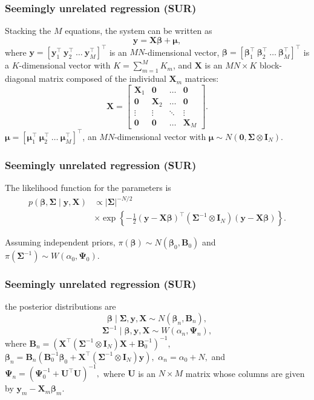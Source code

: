 \documentclass[12pt, compress]{beamer}
\begin{document}
\begin{frame}
	\frametitle{Seemingly unrelated regression (SUR)}
Stacking the $M$ equations, the system can be written as
\[
\bm{y} = \bm{X} \bm{\beta} + \bm{\mu},
\]
where $\bm{y} = \left[\bm{y}_1^{\top} \ \bm{y}_2^{\top} \ \dots \ \bm{y}_M^{\top}\right]^{\top}$ is an $MN$-dimensional vector,
$\bm{\beta} = \left[\bm{\beta}_1^{\top} \ \bm{\beta}_2^{\top} \ \dots \ \bm{\beta}_M^{\top}\right]^{\top}$ is a $K$-dimensional vector with $K = \sum_{m=1}^M K_m$, and $\bm{X}$ is an $MN \times K$ block-diagonal matrix composed of the individual $\bm{X}_m$ matrices:
\[
\bm{X} =
\begin{bmatrix}
	\bm{X}_1 & \bm{0} & \dots & \bm{0} \\
	\bm{0} & \bm{X}_2 & \dots & \bm{0} \\
	\vdots & \vdots & \ddots & \vdots \\
	\bm{0} & \bm{0} & \dots & \bm{X}_M
\end{bmatrix}.
\]
$\bm{\mu} = \left[\bm{\mu}_1^{\top} \ \bm{\mu}_2^{\top} \ \dots \ \bm{\mu}_M^{\top}\right]^{\top}$, an $MN$-dimensional vector with $\bm{\mu} \sim {N}(\bm{0}, \bm{\Sigma} \otimes \bm{I}_N)$.
\end{frame}

\begin{frame}
	\frametitle{Seemingly unrelated regression (SUR)}
The likelihood function for the parameters is
\begin{align*}
p(\bm{\beta}, \bm{\Sigma} \mid \bm{y}, \bm{X}) & \propto |\bm{\Sigma}|^{-N/2}\\
& \times
\exp\left\{ -\frac{1}{2} (\bm{y} - \bm{X} \bm{\beta})^{\top}
(\bm{\Sigma}^{-1} \otimes \bm{I}_N) (\bm{y} - \bm{X} \bm{\beta}) \right\}.
\end{align*}

Assuming independent priors, $\pi(\bm{\beta}) \sim {N}(\bm{\beta}_0, \bm{B}_0)$ and
$\pi(\bm{\Sigma}^{-1}) \sim {W}(\alpha_0, \bm{\Psi}_0)$.
\end{frame}

\begin{frame}
	\frametitle{Seemingly unrelated regression (SUR)}
the posterior distributions are
\begin{equation*}
	\bm{\beta} \mid \bm{\Sigma}, \bm{y}, \bm{X} \sim {N}(\bm{\beta}_n, \bm{B}_n),
\end{equation*}
\begin{equation*}
	\bm{\Sigma}^{-1} \mid \bm{\beta}, \bm{y}, \bm{X} \sim {W}(\alpha_n, \bm{\Psi}_n),
\end{equation*}
where
\(
\bm{B}_n = \left(\bm{X}^{\top} (\bm{\Sigma}^{-1} \otimes \bm{I}_N) \bm{X} + \bm{B}_0^{-1}\right)^{-1},\)
\(
\bm{\beta}_n = \bm{B}_n \left(\bm{B}_0^{-1}\bm{\beta}_0 + \bm{X}^{\top}(\bm{\Sigma}^{-1} \otimes \bm{I}_N)\bm{y}\right),
\)
\(
\alpha_n = \alpha_0 + N,\) and \(\bm{\Psi}_n = \left(\bm{\Psi}_0^{-1} + \bm{U}^{\top}\bm{U}\right)^{-1},
\)
where $\bm{U}$ is an $N \times M$ matrix whose columns are given by
$\bm{y}_m - \bm{X}_m \bm{\beta}_m$.
\end{frame}
\end{document}
